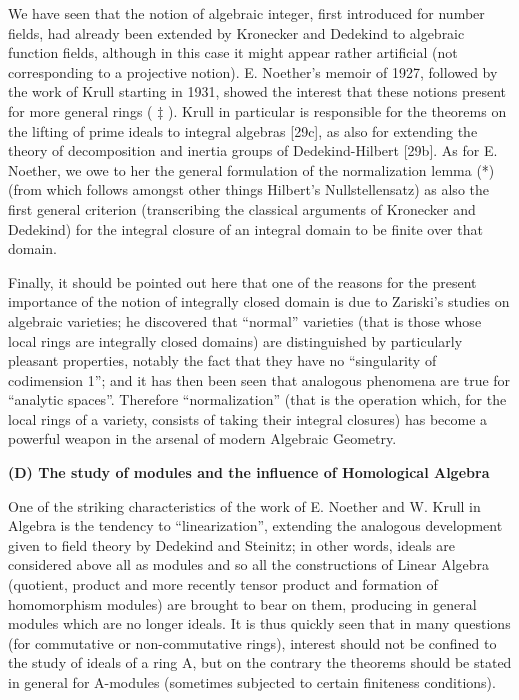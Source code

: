 We have seen that the notion of algebraic integer, first introduced for number fields, had already been extended by Kronecker and Dedekind to algebraic function fields, although in this case it might appear rather artificial (not corresponding to a projective notion). E. Noether's memoir of 1927, followed by the work of Krull starting in 1931, showed the interest that these notions present for more general rings ( \(\ddagger\) ). Krull in particular is responsible for the theorems on the lifting of prime ideals to integral algebras {[}29c{]}, as also for extending the theory of decomposition and inertia groups of Dedekind-Hilbert {[}29b{]}. As for E. Noether, we owe to her the general formulation of the normalization lemma (*) (from which follows amongst other things Hilbert's Nullstellensatz) as also the first general criterion (transcribing the classical arguments of Kronecker and Dedekind) for the integral closure of an integral domain to be finite over that domain.

Finally, it should be pointed out here that one of the reasons for the present importance of the notion of integrally closed domain is due to Zariski's studies on algebraic varieties; he discovered that ``normal'' varieties (that is those whose local rings are integrally closed domains) are distinguished by particularly pleasant properties, notably the fact that they have no ``singularity of codimension 1''; and it has then been seen that analogous phenomena are true for ``analytic spaces''. Therefore ``normalization'' (that is the operation which, for the local rings of a variety, consists of taking their integral closures) has become a powerful weapon in the arsenal of modern Algebraic Geometry.

\textbf{(D) The study of modules and the influence of Homological Algebra}\par

One of the striking characteristics of the work of E. Noether and W. Krull in Algebra is the tendency to ``linearization'', extending the analogous development given to field theory by Dedekind and Steinitz; in other words, ideals are considered above all as modules and so all the constructions of Linear Algebra (quotient, product and more recently tensor product and formation of homomorphism modules) are brought to bear on them, producing in general modules which are no longer ideals. It is thus quickly seen that in many questions (for commutative or non-commutative rings), interest should not be confined to the study of ideals of a ring A, but on the contrary the theorems should be stated in general for A-modules (sometimes subjected to certain finiteness conditions).

